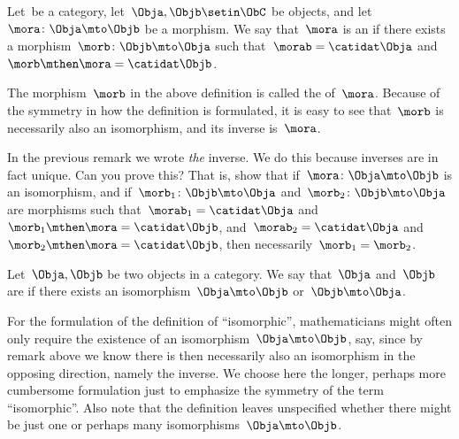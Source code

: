 \begin{ctdefinition}[Isomorphism]
    Let~\CatC be a category, let~$\Obja,\Objb \setin \ObC$ be objects, and let~$\mora \colon \Obja \mto \Objb$ be a morphism.
    We say that~$\mora$ is an  if there exists a morphism~$\morb\colon \Objb \mto \Obja$ such that~$\morab = \catidat\Obja$ and~$\morb \mthen \mora = \catidat\Objb$.
\end{ctdefinition}

\begin{remark}
    \label{rem:inverse}
    The morphism~$\morb$ in the above definition is called the \textbf{} of~$\mora$.
    Because of the symmetry in how the definition is formulated, it is easy to see that~$\morb$ is necessarily also an isomorphism, and its inverse is~$\mora$.
\end{remark}

\begin{exercise}
    \label{ex:isoinverse}
    In the previous remark we wrote \emph{the} inverse.
    We do this because inverses are in fact unique.
    Can you prove this?
    That is, show that if~$\mora \colon \Obja \mto \Objb$ is an isomorphism, and if~$\morb_1\colon \Objb \mto \Obja$ and~$\morb_2\colon \Objb \mto \Obja$ are morphisms such that~$\morab_1 = \catidat\Obja$ and~$\morb_1 \mthen \mora = \catidat\Objb$, and~$\morab_2 = \catidat\Obja$ and~$\morb_2 \mthen \mora = \catidat\Objb$, then necessarily~$\morb_1 = \morb_2$.
\end{exercise}
\begin{solution}
    \missingsolution

\end{solution}

\begin{ctdefinition}\label{def:isomorphic-objects}
    Let~$\Obja,\Objb$ be two objects in a category.
    We say that~$\Obja$ and~$\Objb$ are  if there exists an isomorphism~$\Obja \mto \Objb$ or~$\Objb \mto \Obja$.
\end{ctdefinition}

For the formulation of the definition of ``isomorphic'', mathematicians might often only require the existence of an isomorphism~$\Obja \mto \Objb$, say, since by remark above we know there is then necessarily also an isomorphism in the opposing direction, namely the inverse.
We choose here the longer, perhaps more cumbersome formulation just to emphasize the symmetry of the term ``isomorphic''.
Also note that the definition leaves unspecified whether there might be just one or perhaps many isomorphisms~$\Obja \mto \Objb$.

